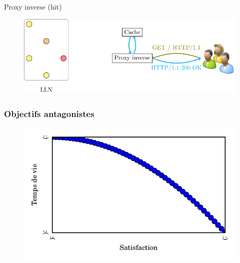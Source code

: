 \begin{frame}{Proxy inverse (hit)}
  \begin{figure}
    \centering
    \includegraphics[width=\textwidth]{figures/schema_rpc_hit_slides.pdf}
  \end{figure}
\end{frame}

\begin{frame}\frametitle{Objectifs antagonistes}


  \begin{figure}
    \centering
    \includegraphics[width=\textwidth]{figures/schema_pareto.pdf}
  \end{figure}




\end{frame}
